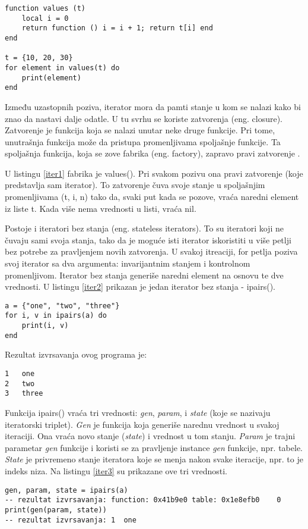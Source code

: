 \documentclass[a4paper]{article}
\begin{document}
\begin{lstlisting}[caption={Primer iteratora nad listom},frame=single, label=iter1]
function values (t)
	local i = 0
	return function () i = i + 1; return t[i] end
end

t = {10, 20, 30}
for element in values(t) do
	print(element)
end
\end{lstlisting}

Između uzastopnih poziva, iterator mora da pamti stanje u kom se nalazi kako bi znao da nastavi dalje odatle. U tu svrhu se koriste zatvorenja (eng. closure). Zatvorenje je funkcija koja se nalazi unutar neke druge funkcije. Pri tome, unutrašnja funkcija može da pristupa promenljivama spoljašnje funkcije. Ta spoljašnja funkcija, koja se zove fabrika (eng. factory), zapravo pravi zatvorenje \cite{lua_org_iterators}.

U listingu \ref{iter1} fabrika je values(). Pri svakom pozivu ona pravi zatvorenje (koje predstavlja sam iterator). To zatvorenje čuva svoje stanje u spoljašnjim promenljivama (t, i, n) tako da, svaki put kada se pozove, vraća naredni element iz liste t. Kada više nema vrednosti u listi, vraća nil.

Postoje i iteratori bez stanja (eng. stateless iterators). To su iteratori koji ne čuvaju sami svoja stanja, tako da je moguće isti iterator iskoristiti u više petlji bez potrebe za pravljenjem novih zatvorenja. U svakoj itreaciji, for petlja poziva svoj iterator sa dva argumenta: invarijantnim stanjem i kontrolnom promenljivom. Iterator bez stanja generiše naredni element na osnovu te dve vrednosti. U listingu \ref{iter2} prikazan je jedan iterator bez stanja - ipairs()\cite{bookProgInLua}.

\begin{lstlisting}[caption={Primer iteratora bez stanja},frame=single, label=iter2]
a = {"one", "two", "three"}
for i, v in ipairs(a) do
	print(i, v)
end
\end{lstlisting}
Rezultat izvrsavanja ovog programa je:
\begin{verbatim}
1	one
2	two
3	three
\end{verbatim}
Funkcija ipairs() vraća tri vrednosti: \textit{gen}, \textit{param}, i \textit{state} (koje se nazivaju iteratorski triplet). \textit{Gen} je funkcija koja generiše narednu vrednost u svakoj iteraciji. Ona vraća novo stanje (\textit{state}) i vrednost u tom stanju. \textit{Param} je trajni parametar \textit{gen} funkcije i koristi se za pravljenje instance \textit{gen} funkcije, npr. tabele. \textit{State} je privremeno stanje iteratora koje se menja nakon svake iteracije, npr. to je indeks niza\cite{luafun}. Na listingu \ref{iter3} su prikazane ove tri vrednosti.
\begin{lstlisting}[caption={Primer iteratora bez stanja (nastavak)},frame=single, label=iter3]
gen, param, state = ipairs(a)
-- rezultat izvrsavanja: function: 0x41b9e0	table: 0x1e8efb0	0
print(gen(param, state))
-- rezultat izvrsavanja: 1	one
\end{lstlisting}
\end{document}
